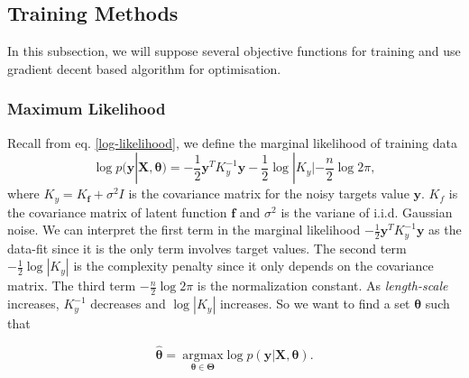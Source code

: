 \documentclass[11pt,a4paper]{article}
\theoremstyle{definition}
\numberwithin{equation}{section}
\let\vec\mathbf
\begin{document}
\subsection{Training Methods}
In this subsection, we will suppose several objective functions for training and use gradient decent based algorithm for optimisation.

\subsubsection{Maximum Likelihood}
Recall from eq. \ref{log-likelihood}, we define the marginal likelihood of training data
\begin{equation}
\log p(\vec y|\vec X, \vec \theta)=-\frac{1}{2}\vec y^T K_y^{-1}\vec y-\frac{1}{2}\log|K_y| - \frac{n}{2}\log 2\pi,
\end{equation}
where $K_y = K_{\vec f}+\sigma^2 I$ is the covariance matrix for the noisy targets value $\vec y$. $K_f$ is the covariance matrix of latent function $\vec f$ and $\sigma^2$ is the variane of i.i.d. Gaussian noise. We can interpret the first term in the marginal likelihood $-\frac{1}{2}\vec y^T K_y^{-1}\vec y$ as the data-fit since it is the only term involves target values. The second term $-\frac{1}{2}\log|K_y|$ is the complexity penalty since it only depends on the covariance matrix. The third term $- \frac{n}{2}\log 2\pi$ is the normalization constant\cite[Rasmussen and Williams, sec 5.4]{RandW}. As \textit{length-scale} increases, $K_y^{-1}$ decreases and $\log|K_y|$ increases. So we want to find a set $\vec \theta$ such that

\begin{equation}
    \vec{\hat \theta} = \ \underset{\vec \theta \in \vec \Theta}{\mathrm{argmax}}\log p(\vec y|\vec X, \vec \theta).
\end{equation}
\end{document}
